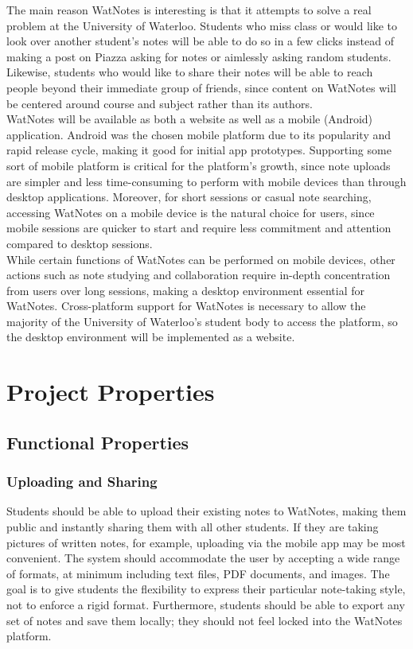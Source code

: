 \documentclass[12pt]{article}
\begin{document}
  The main reason WatNotes is interesting is that it attempts to solve a real problem at the University of Waterloo. Students who miss class or would like to look over another student's notes will be able to do so in a few clicks instead of making a post on Piazza asking for notes or aimlessly asking random students. Likewise, students who would like to share their notes will be able to reach people beyond their immediate group of friends, since content on WatNotes will be centered around course and subject rather than its authors. \\

WatNotes will be available as both a website as well as a mobile (Android) application. Android was the chosen mobile platform due to its popularity and rapid release cycle, making it good for initial app prototypes. Supporting some sort of mobile platform is critical for the platform's growth, since note uploads are simpler and less time-consuming to perform with mobile devices than through desktop applications. Moreover, for short sessions or casual note searching, accessing WatNotes on a mobile device is the natural choice for users, since mobile sessions are quicker to start and require less commitment and attention compared to desktop sessions. \\

While certain functions of WatNotes can be performed on mobile devices, other actions such as note studying and collaboration require in-depth concentration from users over long sessions, making a desktop environment essential for WatNotes. Cross-platform support for WatNotes is necessary to allow the majority of the University of Waterloo's student body to access the platform, so the desktop environment will be implemented as a website. \\
\newpage

\section{Project Properties}
\subsection{Functional Properties}
  \subsubsection{Uploading and Sharing}
  Students should be able to upload their existing notes to WatNotes, making them public and instantly sharing them with all other students. If they are taking pictures of written notes, for example, uploading via the mobile app may be most convenient. The system should accommodate the user by accepting a wide range of formats, at minimum including text files, PDF documents, and images. The goal is to give students the flexibility to express their particular note-taking style, not to enforce a rigid format. Furthermore, students should be able to export any set of notes and save them locally; they should not feel locked into the WatNotes platform.
\end{document}
